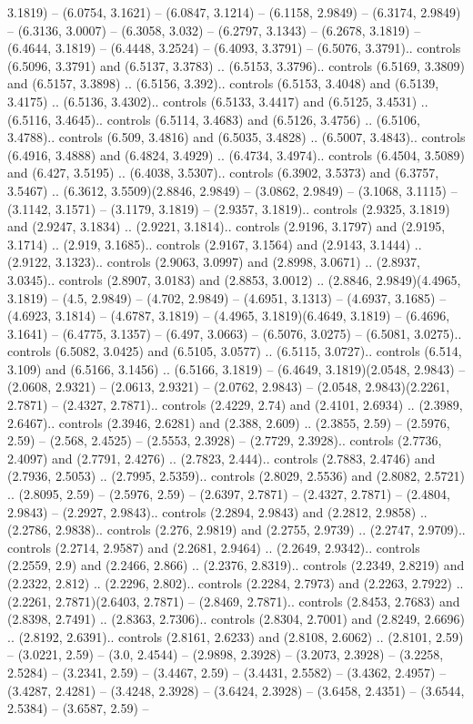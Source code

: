 3.1819) -- (6.0754, 3.1621) -- (6.0847, 3.1214) -- (6.1158, 2.9849) -- (6.3174, 2.9849) -- (6.3136, 3.0007) -- (6.3058, 3.032) -- (6.2797, 3.1343) -- (6.2678, 3.1819) -- (6.4644, 3.1819) -- (6.4448, 3.2524) -- (6.4093, 3.3791) -- (6.5076, 3.3791).. controls (6.5096, 3.3791) and (6.5137, 3.3783) .. (6.5153, 3.3796).. controls (6.5169, 3.3809) and (6.5157, 3.3898) .. (6.5156, 3.392).. controls (6.5153, 3.4048) and (6.5139, 3.4175) .. (6.5136, 3.4302).. controls (6.5133, 3.4417) and (6.5125, 3.4531) .. (6.5116, 3.4645).. controls (6.5114, 3.4683) and (6.5126, 3.4756) .. (6.5106, 3.4788).. controls (6.509, 3.4816) and (6.5035, 3.4828) .. (6.5007, 3.4843).. controls (6.4916, 3.4888) and (6.4824, 3.4929) .. (6.4734, 3.4974).. controls (6.4504, 3.5089) and (6.427, 3.5195) .. (6.4038, 3.5307).. controls (6.3902, 3.5373) and (6.3757, 3.5467) .. (6.3612, 3.5509)(2.8846, 2.9849) -- (3.0862, 2.9849) -- (3.1068, 3.1115) -- (3.1142, 3.1571) -- (3.1179, 3.1819) -- (2.9357, 3.1819).. controls (2.9325, 3.1819) and (2.9247, 3.1834) .. (2.9221, 3.1814).. controls (2.9196, 3.1797) and (2.9195, 3.1714) .. (2.919, 3.1685).. controls (2.9167, 3.1564) and (2.9143, 3.1444) .. (2.9122, 3.1323).. controls (2.9063, 3.0997) and (2.8998, 3.0671) .. (2.8937, 3.0345).. controls (2.8907, 3.0183) and (2.8853, 3.0012) .. (2.8846, 2.9849)(4.4965, 3.1819) -- (4.5, 2.9849) -- (4.702, 2.9849) -- (4.6951, 3.1313) -- (4.6937, 3.1685) -- (4.6923, 3.1814) -- (4.6787, 3.1819) -- (4.4965, 3.1819)(6.4649, 3.1819) -- (6.4696, 3.1641) -- (6.4775, 3.1357) -- (6.497, 3.0663) -- (6.5076, 3.0275) -- (6.5081, 3.0275).. controls (6.5082, 3.0425) and (6.5105, 3.0577) .. (6.5115, 3.0727).. controls (6.514, 3.109) and (6.5166, 3.1456) .. (6.5166, 3.1819) -- (6.4649, 3.1819)(2.0548, 2.9843) -- (2.0608, 2.9321) -- (2.0613, 2.9321) -- (2.0762, 2.9843) -- (2.0548, 2.9843)(2.2261, 2.7871) -- (2.4327, 2.7871).. controls (2.4229, 2.74) and (2.4101, 2.6934) .. (2.3989, 2.6467).. controls (2.3946, 2.6281) and (2.388, 2.609) .. (2.3855, 2.59) -- (2.5976, 2.59) -- (2.568, 2.4525) -- (2.5553, 2.3928) -- (2.7729, 2.3928).. controls (2.7736, 2.4097) and (2.7791, 2.4276) .. (2.7823, 2.444).. controls (2.7883, 2.4746) and (2.7936, 2.5053) .. (2.7995, 2.5359).. controls (2.8029, 2.5536) and (2.8082, 2.5721) .. (2.8095, 2.59) -- (2.5976, 2.59) -- (2.6397, 2.7871) -- (2.4327, 2.7871) -- (2.4804, 2.9843) -- (2.2927, 2.9843).. controls (2.2894, 2.9843) and (2.2812, 2.9858) .. (2.2786, 2.9838).. controls (2.276, 2.9819) and (2.2755, 2.9739) .. (2.2747, 2.9709).. controls (2.2714, 2.9587) and (2.2681, 2.9464) .. (2.2649, 2.9342).. controls (2.2559, 2.9) and (2.2466, 2.866) .. (2.2376, 2.8319).. controls (2.2349, 2.8219) and (2.2322, 2.812) .. (2.2296, 2.802).. controls (2.2284, 2.7973) and (2.2263, 2.7922) .. (2.2261, 2.7871)(2.6403, 2.7871) -- (2.8469, 2.7871).. controls (2.8453, 2.7683) and (2.8398, 2.7491) .. (2.8363, 2.7306).. controls (2.8304, 2.7001) and (2.8249, 2.6696) .. (2.8192, 2.6391).. controls (2.8161, 2.6233) and (2.8108, 2.6062) .. (2.8101, 2.59) -- (3.0221, 2.59) -- (3.0, 2.4544) -- (2.9898, 2.3928) -- (3.2073, 2.3928) -- (3.2258, 2.5284) -- (3.2341, 2.59) -- (3.4467, 2.59) -- (3.4431, 2.5582) -- (3.4362, 2.4957) -- (3.4287, 2.4281) -- (3.4248, 2.3928) -- (3.6424, 2.3928) -- (3.6458, 2.4351) -- (3.6544, 2.5384) -- (3.6587, 2.59) -- 